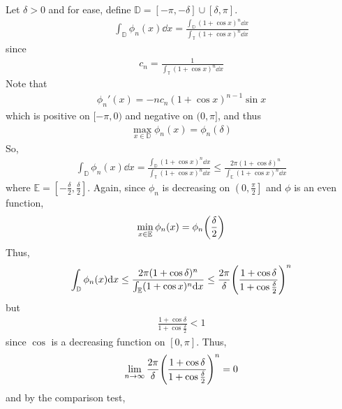\documentclass[12pt]{article}
\theoremstyle{plain}
\begin{document}
\begin{enumerate}[\bf (a)]
        Let $\delta > 0$ and for ease, define $\mathbb{D} = [-\pi, -\delta]\cup[\delta, \pi]$.  
        \begin{align*}
            \int_\mathbb{D} \phi_n(x)\dd x = \frac{\int_\mathbb{D} (1 + \cos x)^n \dd x}{\int_\mathbb{T} (1 + \cos x)^n\dd x}
        \end{align*}
        since
        \begin{align*}
            c_n = \frac{1}{\int_\mathbb{T}(1 + \cos x)^n\dd x}
        \end{align*}
        Note that
        \begin{align*}
            \phi_n'(x) = -nc_n(1 + \cos x)^{n-1}\sin x
        \end{align*}
        which is positive on $[-\pi, 0)$ and negative on $(0, \pi]$, and thus
        \begin{align*}
            \max_{x \in \mathbb{D}}\phi_n(x) = \phi_n(\delta)
        \end{align*}
        So,
        \begin{align*}
            \int_\mathbb{D}\phi_n(x) \dd x = \frac{\int_\mathbb{D} (1 + \cos x)^n \dd x}{\int_\mathbb{T} (1 + \cos x)^n \dd x} \leq \frac{2\pi (1 + \cos \delta)^n}{\int_\mathbb{E}(1 + \cos x)^n \dd x}
        \end{align*}
        where $\mathbb{E} = [-\frac{\delta}{2}, \frac{\delta}{2}]$.  Again, since $\phi_n$ is decreasing on $\left(0, \frac{\pi}{2}\right]$ and $\phi$ is an even function,
        \begin{align*}
            \min_{x\in\mathbb{E}}\phi_n(x) = \phi_n\qty(\frac{\delta}{2})
        \end{align*}
        Thus,
        \begin{align*}
            \int_\mathbb{D}\phi_n(x) \dd x \leq \frac{2\pi (1 + \cos \delta)^n}{\int_\mathbb{E}(1 + \cos x)^n \dd x} \leq \frac{2\pi}{\delta}\qty(\frac{1 + \cos \delta}{1 + \cos \frac{\delta}{2}})^n
        \end{align*}
        but
        \begin{align*}
            \frac{1 + \cos \delta}{1 + \cos \frac{\delta}{2}} < 1
        \end{align*}
        since $\cos$ is a decreasing function on $[0, \pi]$.  Thus,
        \begin{align*}
            \lim_{n\rightarrow \infty}\frac{2\pi}{\delta}\qty(\frac{1 + \cos \delta}{1 + \cos \frac{\delta}{2}})^n = 0
        \end{align*}
        and by the comparison test,

\end{enumerate}
\end{document}
